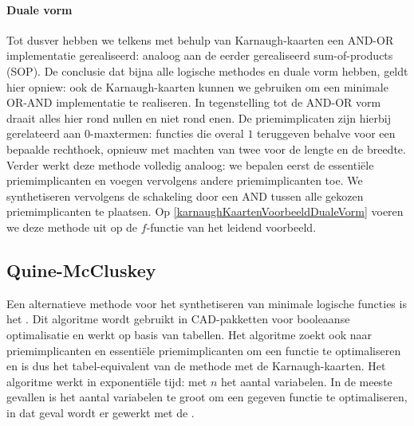 \paragraph{Duale vorm}
Tot dusver hebben we telkens met behulp van Karnaugh-kaarten een AND-OR implementatie gerealiseerd: analoog aan de eerder gerealiseerd sum-of-products (SOP). De conclusie dat bijna alle logische methodes en duale vorm hebben, geldt hier opniew: ook de Karnaugh-kaarten kunnen we gebruiken om een minimale OR-AND implementatie te realiseren. In tegenstelling tot de AND-OR vorm draait alles hier rond nullen en niet rond enen. De priemimplicaten zijn hierbij gerelateerd aan $0$-maxtermen: functies die overal $1$ teruggeven behalve voor een bepaalde rechthoek, opnieuw met machten van twee voor de lengte en de breedte. Verder werkt deze methode volledig analoog: we bepalen eerst de essenti\"ele priemimplicanten en voegen vervolgens andere priemimplicanten toe. We synthetiseren vervolgens de schakeling door een AND tussen alle gekozen priemimplicanten te plaatsen. Op \ref{karnaughKaartenVoorbeeldDualeVorm} voeren we deze methode uit op de $f$-functie van het leidend voorbeeld.


\subsection{Quine-McCluskey}
Een alternatieve methode voor het synthetiseren van minimale logische functies is het . Dit algoritme wordt gebruikt in CAD-pakketten voor booleaanse optimalisatie en werkt op basis van tabellen. Het algoritme zoekt ook naar priemimplicanten en essenti\"ele priemimplicanten om een functie te optimaliseren en is dus het tabel-equivalent van de methode met de Karnaugh-kaarten. Het algoritme werkt in exponenti\"ele tijd:  met $n$ het aantal variabelen. In de meeste gevallen is het aantal variabelen te groot om een gegeven functie te optimaliseren, in dat geval wordt er gewerkt met de .

